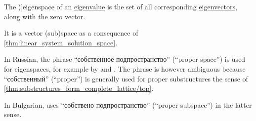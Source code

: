 \begin{definition}\label{def:eigenspace}
  The \term[ru=собственное подпространство, en=eigenspace (\cite[265]{FriedbergInselSpence2018LinearAlgebra})]{eigenspace} of an \hyperref[def:eigenpair]{eigenvalue} is the set of all corresponding \hyperref[def:eigenpair]{eigenvectors}, along with the zero vector.
\end{definition}
\begin{comments}
  \item It is a vector (sub)space as a consequence of \cref{thm:linear_system_solution_space}.

  \item In Russian, the phrase \enquote{собственное подпространство} (\enquote{proper space}) is used for eigenspaces, for example by  and . The phrase is however ambiguous because \enquote{собственный} (\enquote{proper}) is generally used for proper substructures the sense of \cref{thm:substructures_form_complete_lattice/top}.

  In Bulgarian,  uses \enquote{собствено подпространство} (\enquote{proper subspace}) in the latter sense.
\end{comments}

